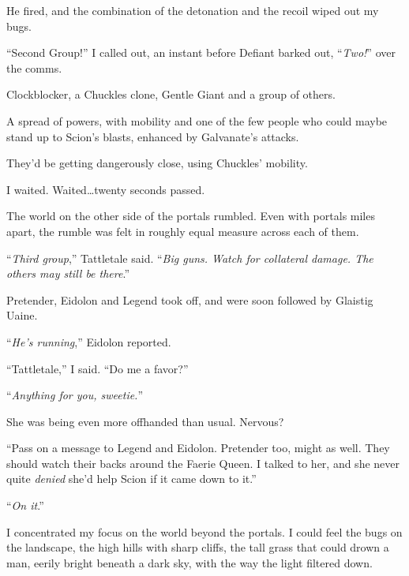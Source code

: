 He fired, and the combination of the detonation and the recoil wiped out my bugs.



``Second Group!'' I called out, an instant before Defiant barked out, ``\emph{Two!}'' over the comms.



Clockblocker, a Chuckles clone, Gentle Giant and a group of others.



A spread of powers, with mobility and one of the few people who could maybe stand up to Scion's blasts, enhanced by Galvanate's attacks.



They'd be getting dangerously close, using Chuckles' mobility.



I waited.  Waited\ldots  twenty seconds passed.



The world on the other side of the portals rumbled.  Even with portals miles apart, the rumble was felt in roughly equal measure across each of them.



``\emph{Third group},'' Tattletale said.  ``\emph{Big guns.  Watch for collateral damage.  The others may still be there}.''



Pretender, Eidolon and Legend took off, and were soon followed by Glaistig Uaine.



``\emph{He's running},'' Eidolon reported.



``Tattletale,'' I said.  ``Do me a favor?''



``\emph{Anything for you, sweetie.}''



She was being even more offhanded than usual.  Nervous?



``Pass on a message to Legend and Eidolon.  Pretender too, might as well.  They should watch their backs around the Faerie Queen.  I talked to her, and she never quite \emph{denied} she'd help Scion if it came down to it.''



``\emph{On it}.''



I concentrated my focus on the world beyond the portals.  I could feel the bugs on the landscape, the high hills with sharp cliffs, the tall grass that could drown a man, eerily bright beneath a dark sky, with the way the light filtered down.



